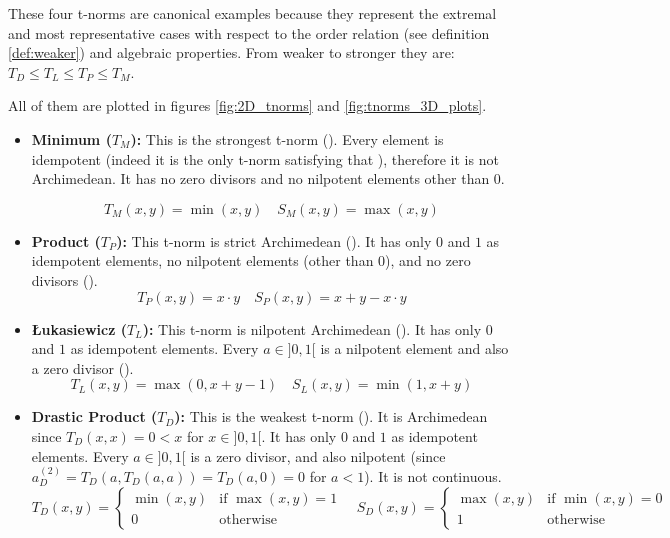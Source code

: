   \begin{example}\label{ex:basic_tnorms}
    These four t-norms are canonical examples because they represent the extremal and most representative cases with respect to the order relation (see definition \ref{def:weaker}) and algebraic properties. From weaker to stronger they are: $T_D \leq T_L \leq T_P \leq T_M$. 
    
    All of them are plotted in figures \ref{fig:2D_tnorms} and \ref{fig:tnorms_3D_plots}.
      \begin{itemize}
        \item \textbf{Minimum ($T_M$):} 
            This is the strongest t-norm (\cite[Rem.~1.5(i)]{Klement2000}). Every element is idempotent (indeed it is the only t-norm satisfying that \cite[Lem.~1.2.3]{FULLER2} ), therefore it is not Archimedean. It has no zero divisors and no nilpotent elements other than 0.
    
        \[T_M(x, y) = \min(x, y) \quad S_M(x, y) = \max(x, y)
    \]
        \item \textbf{Product ($T_P$):} 
        This t-norm is strict Archimedean (\cite[Ex.~2.14(i)]{Klement2000}). It has only $0$ and $1$ as idempotent elements, no nilpotent elements (other than $0$), and no zero divisors (\cite[Ex.~2.2(i)]{Klement2000}).
        \[T_P(x, y) = x \cdot y \quad S_P(x, y) = x + y - x \cdot y\]
        \item \textbf{Łukasiewicz ($T_L$):} 
        This t-norm is nilpotent Archimedean (\cite[Ex.~2.14(i)]{Klement2000}). It has only $0$ and $1$ as idempotent elements. Every $a \in ]0,1[$ is a nilpotent element and also a zero divisor (\cite[Ex.~2.2(i)]{Klement2000}).
        \[T_L(x, y) = \max(0, x + y - 1) \quad S_L(x, y) = \min(1, x + y)\]
        \item \textbf{Drastic Product ($T_D$):} This is the weakest t-norm (\cite[Rem.~1.5(i)]{Klement2000}). It is Archimedean since $T_D(x,x)=0 < x$ for $x \in ]0,1[$. It has only $0$ and $1$ as idempotent elements. Every $a \in ]0,1[$ is a zero divisor, and also nilpotent (since $a_D^{(2)} = T_D(a, T_D(a,a)) = T_D(a,0) = 0$ for $a<1$). It is not continuous.
        \[T_D(x, y) = \begin{cases} \min(x,y) & \text{if } \max(x,y)=1 \\ 0 & \text{otherwise} \end{cases} \quad S_D(x, y) = \begin{cases} \max(x,y) & \text{if } \min(x,y)=0 \\ 1 & \text{otherwise} \end{cases}\]
      \end{itemize}
    \end{example}


